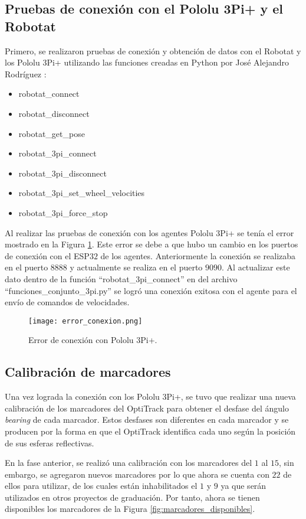 \subsection{Pruebas de conexión con el Pololu 3Pi+ y el Robotat}
 Primero, se realizaron pruebas de conexión y obtención de datos con el Robotat y los Pololu 3Pi+ utilizando las funciones creadas en Python por José Alejandro Rodríguez \cite{RodriguezJA_2023_tesis}:
\begin{itemize}
	\item robotat\_connect
	\item robotat\_disconnect
	\item robotat\_get\_pose
	\item robotat\_3pi\_connect
	\item robotat\_3pi\_disconnect
	\item robotat\_3pi\_set\_wheel\_velocities
	\item robotat\_3pi\_force\_stop
\end{itemize}

Al realizar las pruebas de conexión con los agentes Pololu 3Pi+ se tenía el error mostrado en la Figura \ref{fig:error_conexion}. Este error se debe a que hubo un cambio en los puertos de conexión con el ESP$32$ de los agentes. Anteriormente la conexión se realizaba en el puerto $8888$ y actualmente se realiza en el puerto $9090$. Al actualizar este dato dentro de la función ``robotat\_3pi\_connect''  en del archivo ``funciones\_conjunto\_3pi.py'' se logró una conexión exitosa con el agente para el envío de comandos de velocidades.

\begin{figure}[H]
	\centering
	\texttt{[image: error\_conexion.png]}
	\caption{Error de conexión con Pololu 3Pi+.}
	\label{fig:error_conexion}
\end{figure}

\subsection{Calibración de marcadores}
Una vez lograda la conexión con los Pololu 3Pi+, se tuvo que realizar una nueva calibración de los marcadores del OptiTrack para obtener el desfase del ángulo \textit{bearing} de cada marcador. Estos desfases son diferentes en cada marcador y se producen por la forma en que el OptiTrack identifica cada uno según la posición de sus esferas reflectivas.

En la fase anterior, se realizó una calibración con los marcadores del $1$ al $15$, sin embargo, se agregaron nuevos marcadores por lo que ahora se cuenta con $22$ de ellos para utilizar, de los cuales están inhabilitados el $1$ y $9$ ya que serán utilizados en otros proyectos de graduación. Por tanto, ahora se tienen disponibles los marcadores de la Figura \ref{fig:marcadores_disponibles}. 

